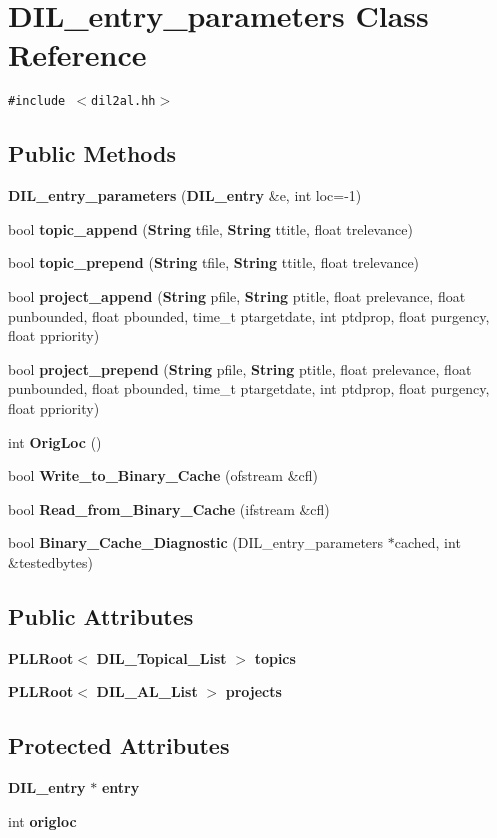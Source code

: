 \section{DIL\_\-entry\_\-parameters  Class Reference}
\label{classDIL__entry__parameters}
{\tt \#include $<$dil2al.hh$>$}

\subsection*{Public Methods}
\begin{CompactItemize}
\item 
{\bf DIL\_\-entry\_\-parameters} ({\bf DIL\_\-entry} \&e, int loc=-1)
\item 
bool {\bf topic\_\-append} ({\bf String} tfile, {\bf String} ttitle, float trelevance)
\item 
bool {\bf topic\_\-prepend} ({\bf String} tfile, {\bf String} ttitle, float trelevance)
\item 
bool {\bf project\_\-append} ({\bf String} pfile, {\bf String} ptitle, float prelevance, float punbounded, float pbounded, time\_\-t ptargetdate, int ptdprop, float purgency, float ppriority)
\item 
bool {\bf project\_\-prepend} ({\bf String} pfile, {\bf String} ptitle, float prelevance, float punbounded, float pbounded, time\_\-t ptargetdate, int ptdprop, float purgency, float ppriority)
\item 
int {\bf Orig\-Loc} ()
\item 
bool {\bf Write\_\-to\_\-Binary\_\-Cache} (ofstream \&cfl)
\item 
bool {\bf Read\_\-from\_\-Binary\_\-Cache} (ifstream \&cfl)
\item 
bool {\bf Binary\_\-Cache\_\-Diagnostic} (DIL\_\-entry\_\-parameters $\ast$cached, int \&testedbytes)
\end{CompactItemize}
\subsection*{Public Attributes}
\begin{CompactItemize}
\item 
{\bf PLLRoot}$<$ {\bf DIL\_\-Topical\_\-List} $>$ {\bf topics}
\item 
{\bf PLLRoot}$<$ {\bf DIL\_\-AL\_\-List} $>$ {\bf projects}
\end{CompactItemize}
\subsection*{Protected Attributes}
\begin{CompactItemize}
\item 
{\bf DIL\_\-entry} $\ast$ {\bf entry}
\item 
int {\bf origloc}
\end{CompactItemize}


